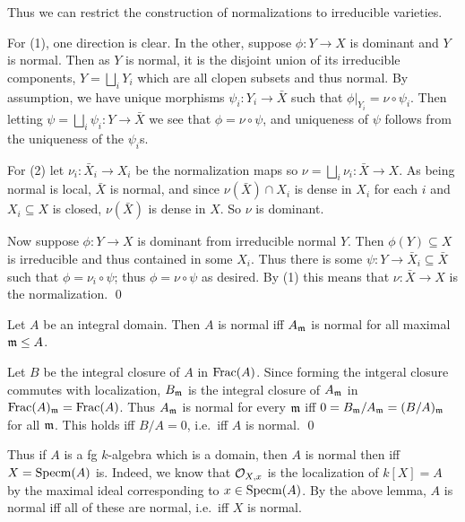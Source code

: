     Thus we can restrict the construction of normalizations to irreducible varieties.

\elemm

\bproof

    For (1), one direction is clear.
    In the other, suppose $\phi\colon Y\to X$ is dominant and $Y$ is normal.
    Then as $Y$ is normal, it is the disjoint union of its irreducible components, $Y=\bigsqcup_iY_i$ which are all clopen subsets and thus normal.
    By assumption, we have unique morphisms $\psi_i\colon Y_i\to\bar X$ such that $\phi|_{Y_i}=\nu\circ\psi_i$.
    Then letting $\psi=\bigsqcup_i\psi_i\colon Y\to\bar X$ we see that $\phi=\nu\circ\psi$, and uniqueness of $\psi$ follows from the uniqueness of the $\psi_i$s.

    For (2) let $\nu_i\colon\bar X_i\to X_i$ be the normalization maps so $\nu=\bigsqcup_i\nu_i\colon\bar X\to X$.
    As being normal is local, $\bar X$ is normal, and since $\nu(\bar X)\cap X_i$ is dense in $X_i$ for each $i$ and $X_i\subseteq X$ is closed, $\nu(\bar X)$ is dense in $X$.
    So $\nu$ is dominant.

    Now suppose $\phi\colon Y\to X$ is dominant from irreducible normal $Y$.
    Then $\phi(Y)\subseteq X$ is irreducible and thus contained in some $X_i$.
    Thus there is some $\psi\colon Y\to\bar X_i\subseteq\bar X$ such that $\phi=\nu_i\circ\psi$; thus $\phi=\nu\circ\psi$ as desired.
    By (1) this means that $\nu\colon\bar X\to X$ is the normalization.
    \qed

\eproof

\blemm

    Let $A$ be an integral domain.
    Then $A$ is normal iff $A_{{\frak m}}$ is normal for all maximal ${{\frak m}}\leq A$.

\elemm

\bproof

    Let $B$ be the integral closure of $A$ in ${\rm Frac}(A)$.
    Since forming the intgeral closure commutes with localization, $B_{{\frak m}}$ is the integral closure of $A_{{\frak m}}$ in ${\rm Frac}(A)_{{\frak m}}={\rm Frac}(A)$.
    Thus $A_{{\frak m}}$ is normal for every ${{\frak m}}$ iff $0=B_{{\frak m}}/A_{{\frak m}}=(B/A)_{{\frak m}}$ for all ${{\frak m}}$.
    This holds iff $B/A=0$, i.e.\ iff $A$ is normal.
    \qed

\eproof

Thus if $A$ is a fg $k$-algebra which is a domain, then $A$ is normal then iff $X={\rm Specm}(A)$ is.
Indeed, we know that ${{\cal O}}_{X,x}$ is the localization of $k[X]=A$ by the maximal ideal corresponding to $x\in{\rm Specm}(A)$.
By the above lemma, $A$ is normal iff all of these are normal, i.e.\ iff $X$ is normal.

